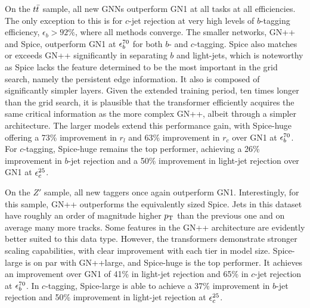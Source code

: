 On the $t\bar{t}$ sample, all new GNNs outperform GN1 at all tasks at all efficiencies.
The only exception to this is for $c$-jet rejection at very high levels of $b$-tagging efficiency, $\epsilon_b > 92\%$, where all methods converge.
The smaller networks, GN++ and Spice, outperform GN1 at $\epsilon_b^{70}$ for both $b$- and $c$-tagging.
Spice also matches or exceeds GN++ significantly in separating $b$ and light-jets, which is noteworthy as Spice lacks the feature determined to be the most important in the grid search, namely the persistent edge information.
It also is composed of significantly simpler layers.
Given the extended training period, ten times longer than the grid search, it is plausible that the transformer efficiently acquires the same critical information as the more complex GN++, albeit through a simpler architecture.
The larger models extend this performance gain, with Spice-huge offering a 73\% improvement in $r_l$ and 63\% improvement in $r_c$ over GN1 at $\epsilon_b^{70}$.
For $c$-tagging, Spice-huge remains the top performer, achieving a 26\% improvement in $b$-jet rejection and a 50\% improvement in light-jet rejection over GN1 at $\epsilon_c^{25}$.

On the $Z'$ sample, all new taggers once again outperform GN1.
Interestingly, for this sample, GN++ outperforms the equivalently sized Spice.
Jets in this dataset have roughly an order of magnitude higher $p_\mathrm{T}$ than the previous one and on average many more tracks.
Some features in the GN++ architecture are evidently better suited to this data type.
However, the transformers demonstrate stronger scaling capabilities, with clear improvement with each tier in model size.
Spice-large is on par with GN++large, and Spice-huge is the top performer.
It achieves an improvement over GN1 of 41\% in light-jet rejection and 65\% in $c$-jet rejection at $\epsilon_b^{70}$.
In $c$-tagging, Spice-large is able to achieve a 37\% improvement in $b$-jet rejection and 50\% improvement in light-jet rejection at $\epsilon_c^{25}$.

